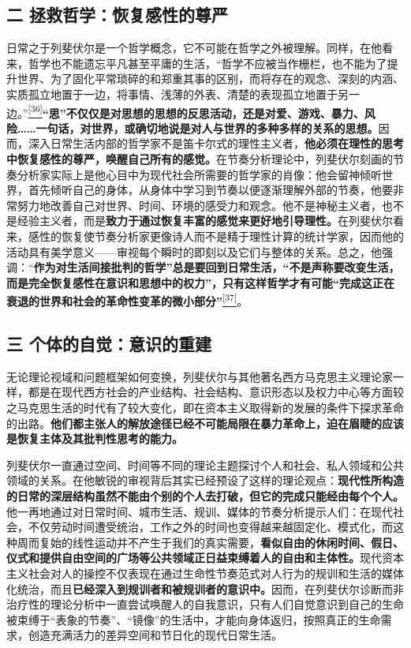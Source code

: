 \documentclass[UTF8, fontset = sourcesans, a4paper, oneside, zihao =
-4, scheme=chinese, no-math, space=true]{ctexbook}
\begin{document}
\subsection{二
拯救哲学：恢复感性的尊严}\label{part0009_split_004.htmlux5cux23c054}

日常之于列斐伏尔是一个哲学概念，它不可能在哲学之外被理解。同样，在他看来，哲学也不能遗忘平凡甚至平庸的生活，``哲学不应被当作栅栏，也不能为了提升世界、为了固化平常琐碎的和郑重其事的区别，而将存在的观念、深刻的内涵、实质孤立地置于一边，将事情、浅薄的外表、清楚的表现孤立地置于另一边。''\protect\hypertarget{part0009_split_004.htmlux5cux23w36}{}{}\protect\hyperlink{part0009_split_004.htmlux5cux23m36}{\textsuperscript{{[}36{]}}}\textbf{``思''不仅仅是对思想的思想的反思活动，还是对爱、游戏、暴力、风险……一句话，对世界，或确切地说是对人与世界的多种多样的关系的思想。}因而，深入日常生活内部的哲学家不是笛卡尔式的理性主义者，\textbf{他必须在理性的思考中恢复感性的尊严，唤醒自己所有的感觉。}在节奏分析理论中，列斐伏尔刻画的节奏分析家实际上是他心目中为现代社会所需要的哲学家的肖像：他会留神倾听世界，首先倾听自己的身体，从身体中学习到节奏以便逐渐理解外部的节奏，他要非常努力地改善自己对世界、时间、环境的感受力和观念。他不是神秘主义者，也不是经验主义者，而是\textbf{致力于通过恢复丰富的感觉来更好地引导理性。}在列斐伏尔看来，感性的恢复使节奏分析家更像诗人而不是精于理性计算的统计学家，因而他的活动具有美学意义------审视每个瞬时的即刻以及它们与整体的关系。总之，他强调：``\textbf{作为对生活间接批判的哲学''总是要回到日常生活，``不是声称要改变生活，而是完全恢复感性在意识和思想中的权力''，只有这样哲学才有可能``完成这正在衰退的世界和社会的革命性变革的微小部分''}\protect\hypertarget{part0009_split_004.htmlux5cux23w37}{}{}\protect\hyperlink{part0009_split_004.htmlux5cux23m37}{\textsuperscript{{[}37{]}}}。

\subsection{三
个体的自觉：意识的重建}\label{part0009_split_004.htmlux5cux23c055}

无论理论视域和问题框架如何变换，列斐伏尔与其他著名西方马克思主义理论家一样，都是在现代西方社会的产业结构、社会结构、意识形态以及权力中心等方面较之马克思生活的时代有了较大变化，即在资本主义取得新的发展的条件下探求革命的出路。\textbf{他们都主张人的解放途径已经不可能局限在暴力革命上，迫在眉睫的应该是恢复主体及其批判性思考的能力。}

列斐伏尔一直通过空间、时间等不同的理论主题探讨个人和社会、私人领域和公共领域的关系。在他敏锐的审视背后其实已经预设了这样的理论观点：\textbf{现代性所构造的日常的深层结构虽然不能由个别的个人去打破，但它的完成只能经由每个个人。}他一再地通过对日常时间、城市生活、规训、媒体的节奏分析提示人们：在现代社会，不仅劳动时间遭受统治，工作之外的时间也变得越来越固定化、模式化，而这种周而复始的线性运动并不产生于我们的真实需要，\textbf{看似自由的休闲时间、假日、仪式和提供自由空间的广场等公共领域正日益束缚着人的自由和主体性。}现代资本主义社会对人的操控不仅表现在通过生命性节奏范式对人行为的规训和生活的媒体化统治，而且\textbf{已经深入到规训者和被规训者的意识中。}因而，在列斐伏尔诊断而非治疗性的理论分析中一直尝试唤醒人的自我意识，只有人们自觉意识到自己的生命被束缚于``表象的节奏''、``镜像''的生活中，才能向身体返归，按照真正的生命需求，创造充满活力的差异空间和节日化的现代日常生活。
\end{document}
